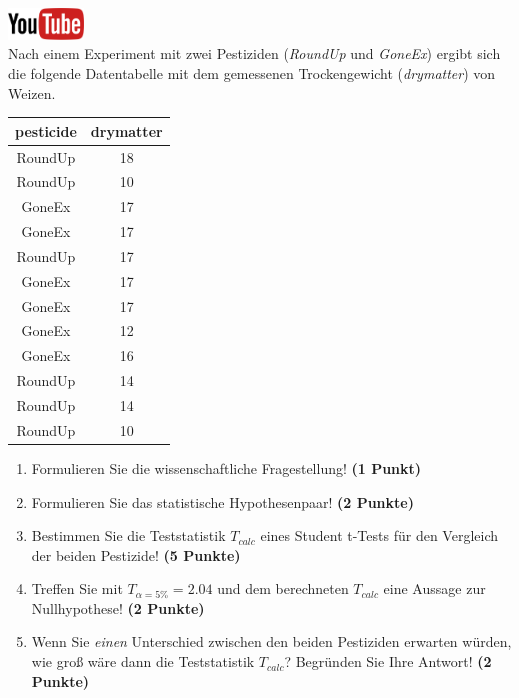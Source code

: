 \documentclass[a4paper, 10pt]{scrartcl}\usepackage[]{graphicx}\usepackage[]{xcolor}
\begin{document}
\hfill\href{https://youtu.be/Cq_rF_z4xOk}{\includegraphics[width =
  2cm]{img/youtube}}\\[1Ex]

Nach einem Experiment mit zwei Pestiziden (\textit{RoundUp} und
\textit{GoneEx}) ergibt sich die folgende Datentabelle mit dem gemessenen
Trockengewicht (\textit{drymatter}) von Weizen.

\begin{table}[!h]
\centering
\begin{tabular}{cc}
\toprule
pesticide & drymatter\\
\midrule
RoundUp & 18\\
RoundUp & 10\\
GoneEx & 17\\
GoneEx & 17\\
RoundUp & 17\\
\addlinespace
GoneEx & 17\\
GoneEx & 17\\
GoneEx & 12\\
GoneEx & 16\\
RoundUp & 14\\
\addlinespace
RoundUp & 14\\
RoundUp & 10\\
\bottomrule
\end{tabular}
\end{table}



\begin{enumerate}
  \item Formulieren Sie die wissenschaftliche Fragestellung! \textbf{(1 Punkt)}
  \item Formulieren Sie das statistische Hypothesenpaar! \textbf{(2
      Punkte)}
  \item Bestimmen Sie die Teststatistik $T_{calc}$ eines Student t-Tests f{\"u}r den
  Vergleich der beiden Pestizide! \textbf{(5 Punkte)}
\item Treffen Sie mit $T_{\alpha = 5\%} = 2.04$ und dem berechneten $T_{calc}$ eine Aussage
  zur Nullhypothese! \textbf{(2 Punkte)}
\item Wenn Sie \textit{einen} Unterschied zwischen den beiden
  Pestiziden erwarten w{\"u}rden, wie gro{\ss} w{\"a}re dann die Teststatistik
  $T_{calc}$? Begr{\"u}nden Sie Ihre Antwort! \textbf{(2 Punkte)}
\end{enumerate} 
\clearpage
\end{document}

